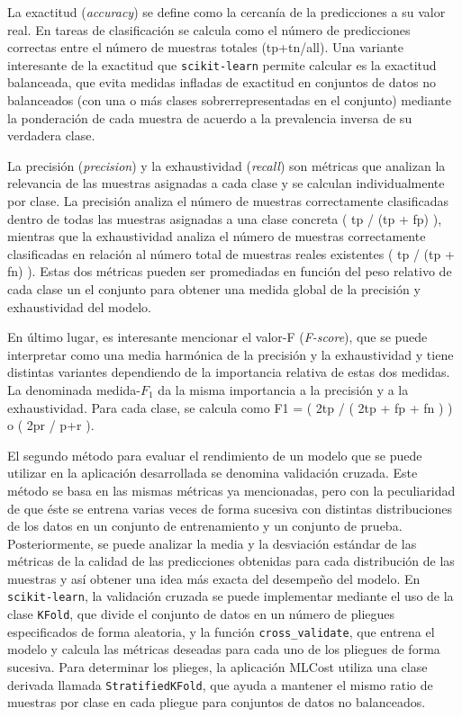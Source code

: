 La exactitud (\emph{accuracy}) se define como la cercanía de la predicciones a su valor real. En tareas de clasificación se calcula como el número de predicciones correctas entre el número de muestras totales (tp+tn/all). Una variante interesante de la exactitud que \texttt{scikit-learn} permite calcular es la exactitud balanceada, que evita medidas infladas de exactitud en conjuntos de datos no balanceados (con una o más clases sobrerrepresentadas en el conjunto) mediante la ponderación de cada muestra de acuerdo a la prevalencia inversa de su verdadera clase.

La precisión (\emph{precision}) y la exhaustividad (\emph{recall}) son métricas que analizan la relevancia de las muestras asignadas a cada clase y se calculan individualmente por clase. La precisión analiza el número de muestras correctamente clasificadas dentro de todas las muestras asignadas a una clase concreta ( tp / (tp + fp) ), mientras que la exhaustividad analiza el número de muestras correctamente clasificadas en relación al número total de muestras reales existentes ( tp / (tp + fn) ). Estas dos métricas pueden ser promediadas en función del peso relativo de cada clase un el conjunto para obtener una medida global de la precisión y exhaustividad del modelo.

En último lugar, es interesante mencionar el valor-F (\emph{F-score}), que se puede interpretar como una media harmónica de la precisión y la exhaustividad y tiene distintas variantes dependiendo de la importancia relativa de estas dos medidas. La denominada medida-$F_1$ da la misma importancia a la precisión y a la exhaustividad. Para cada clase, se calcula como F1 = ( 2tp / ( 2tp + fp + fn ) ) o ( 2pr / p+r ). 


El segundo método para evaluar el rendimiento de un modelo que se puede utilizar en la aplicación desarrollada se denomina validación cruzada. Este método se basa en las mismas métricas ya mencionadas, pero con la peculiaridad de que éste se entrena varias veces de forma sucesiva con distintas distribuciones de los datos en un conjunto de entrenamiento y un conjunto de prueba. Posteriormente, se puede analizar la media y la desviación estándar de las métricas de la calidad de las predicciones obtenidas para cada distribución de las muestras y así obtener una idea más exacta del desempeño del modelo. En \texttt{scikit-learn}, la validación cruzada se puede implementar mediante el uso de la clase \texttt{KFold}, que divide el conjunto de datos en un número de pliegues especificados de forma aleatoria, y la función \texttt{cross\_validate}, que entrena el modelo y calcula las métricas deseadas para cada uno de los pliegues de forma sucesiva. Para determinar los plieges, la aplicación MLCost utiliza una clase derivada llamada \texttt{StratifiedKFold}, que ayuda a mantener el mismo ratio de muestras por clase en cada pliegue para conjuntos de datos no balanceados.


